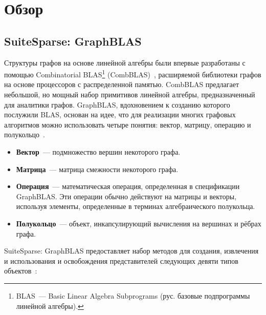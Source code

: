 \documentclass[14pt]{matmex-diploma-custom}
\begin{document}
\section{Обзор}
\subsection{SuiteSparse: GraphBLAS}
Структуры графов на основе линейной алгебры были впервые разработаны с помощью
Combinatorial BLAS\footnote{BLAS~--- Basic Linear Algebra Subprograms (рус. базовые подпрограммы линейной алгебры).} (CombBLAS)~\cite{CombBLAS}, расширяемой библиотеки графов на основе процессоров с распределенной памятью. CombBLAS предлагает небольшой, но мощный набор примитивов линейной алгебры, предназначенный для аналитики графов. GraphBLAS, вдохновением к созданию которого послужили BLAS, основан на идее, что для реализации многих графовых алгоритмов можно использовать четыре понятия: вектор, матрицу, операцию и полукольцо~\cite{GraphBLAST}. 
\begin{itemize}
\item \textbf{Вектор}~--- подмножество вершин некоторого графа.
\item \textbf{Матрица}~--- матрица смежности некоторого графа.
\item \textbf{Операция}~--- математическая операция, определенная в спецификации GraphBLAS. Эти операции обычно действуют на матрицы и векторы, используя элементы, определенные в терминах алгебраического полукольца.
\item \textbf{Полукольцо}~--- объект, инкапсулирующий вычисления на вершинах и рёбрах графа.
\end{itemize}
SuiteSparse: GraphBLAS предоставляет набор методов для создания, извлечения и использования и освобождения представителей следующих девяти типов объектов~\cite{SuiteSparse2}:
\end{document}
